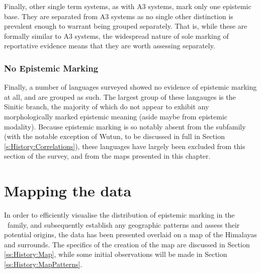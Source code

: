 Finally, other single term systems, as with A3 systems, mark only one epistemic base. They are separated from A3 systems as no single other distinction is prevalent enough to warrant being grouped separately. That is, while these are formally similar to A3 systems, the widespread nature of sole marking of reportative evidence means that they are worth assessing separately. 
\subsubsection{No Epistemic Marking}
Finally, a number of languages surveyed showed no evidence of epistemic marking at all, and are grouped as such. The largest group of these langauges is the Sinitic branch, the majority of which do not appear to exhibit any morphologically marked epistemic meaning (aside maybe from epistemic modality). Because epistemic marking is so notably absent from the subfamily (with the notable exception of Wutun, to be discussed in full in Section \ref{s:History:Correlations}), these languages have largely been excluded from this section of the survey, and from the maps presented in this chapter.

\section{Mapping the data}\label{s:History:Map}
In order to efficiently visualise the distribution of epistemic marking in the \lfam\ family, and subsequently establish any geographic patterns and assess their potential origins, the data has been presented overlaid on a map of the Himalayas and surrounds. The specifics of the creation of the map are discussed in Section \ref{ss:History:Map}, while some initial observations will be made in Section \ref{ss:History:MapPatterns}.

